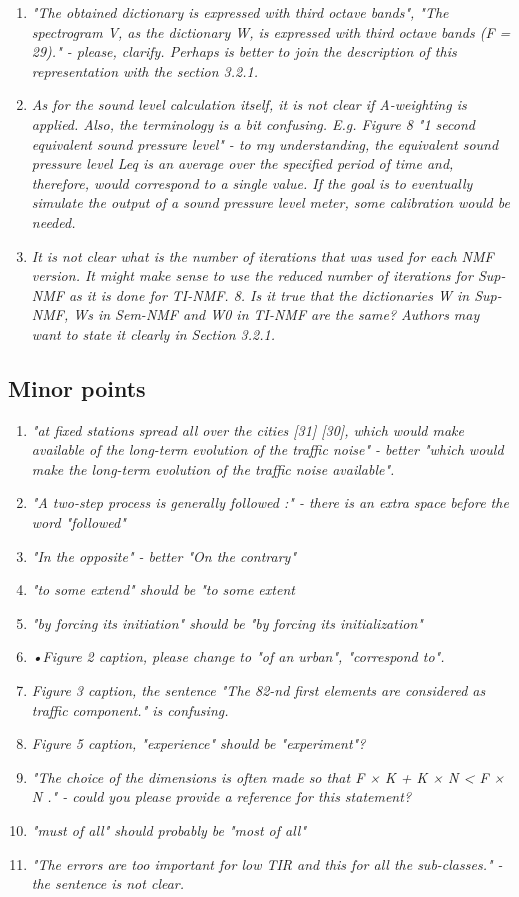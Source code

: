 \documentclass[10pt]{article}
\begin{document}
\begin{enumerate}
\item \emph{"The obtained dictionary is expressed with third octave bands", "The spectrogram V, as the dictionary W, is expressed with third octave bands (F = 29)." - please, clarify. Perhaps is better to join the description of this representation with the section 3.2.1.}

\item \emph{As for the sound level calculation itself, it is not clear if A-weighting is applied.
Also, the terminology is a bit confusing. E.g. Figure 8 "1 second equivalent sound pressure level" - to my understanding, the equivalent sound pressure level Leq is an average over the specified period of time and, therefore, would correspond to a single value. If the goal is to eventually simulate the output of a sound pressure level meter, some calibration would be needed.}

\item \emph{It is not clear what is the number of iterations that was used for each NMF version. It might make sense to use the reduced number of iterations for Sup-NMF as it is done for TI-NMF.
8. Is it true that the dictionaries W in Sup-NMF, Ws in Sem-NMF and W0 in TI-NMF are the same? Authors may want to state it clearly in Section 3.2.1.}

\end{enumerate}
\subsection{Minor points}

\begin{enumerate}
\item \emph{"at fixed stations spread all over the cities [31] [30], which would make available of the long-term evolution of the traffic noise" - better "which would make the long-term evolution of the traffic noise available".}
\item \emph{"A two-step process is generally followed :" - there is an extra space before the word "followed" }
\item \emph{"In the opposite" - better "On the contrary"}
\item \emph{"to some extend" should be "to some extent}
\item \emph{"by forcing its initiation" should be "by forcing its initialization"}
\item \emph{•Figure 2 caption, please change to "of an urban", "correspond to".}
\item \emph{Figure 3 caption, the sentence "The 82-nd first elements are considered as traffic component." is confusing.}
\item \emph{Figure 5 caption, "experience" should be "experiment"?}
\item \emph{"The choice of the dimensions is often made so that F × K + K × N < F × N ." - could you please provide a reference for this statement? }
\item \emph{"must of all" should probably be "most of all" }
\item \emph{"The errors are too important for low TIR and this for all the sub-classes." - the sentence is not clear.}

\end{enumerate}
\end{document}
